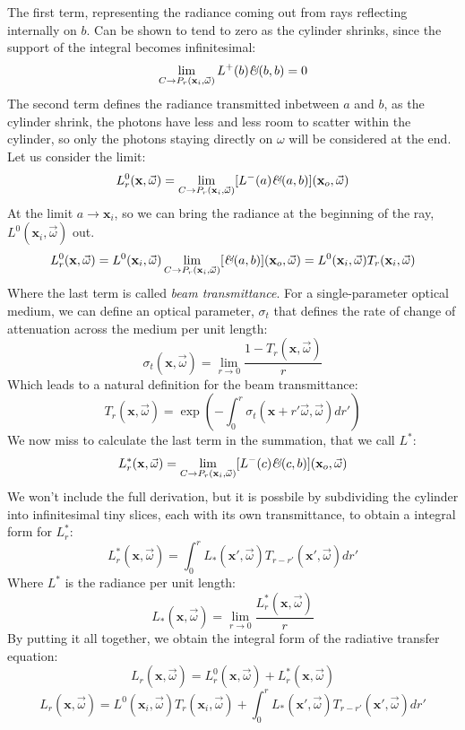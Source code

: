 The first term, representing the radiance coming out from rays reflecting internally on $b$. Can be shown to tend to zero as the cylinder shrinks, since the support of the integral becomes infinitesimal:
$$
\lim_{C\rightarrow P_r(\mathbf{x}_i,\vec{\omega})} L^+(b)\textit{\text{\&}}(b,b) = 0
$$
The second term defines the radiance transmitted inbetween $a$ and $b$, as the cylinder shrink, the photons have less and less room to scatter within the cylinder, so only the photons staying directly on $\omega$ will be considered at the end. Let us consider the limit:
$$
L_r^0(\mathbf{x}, \vec{\omega}) = \lim_{C\rightarrow P_r(\mathbf{x}_i,\vec{\omega})} [L^-(a)\textit{\text{\&}}(a,b)] (\mathbf{x}_o, \vec{\omega})
$$
At the limit $a \rightarrow \mathbf{x}_i$, so we can bring the radiance at the beginning of the ray, $L^0(\mathbf{x}_i, \vec{\omega})$ out. 
$$
L_r^0(\mathbf{x}, \vec{\omega}) = L^0(\mathbf{x}_i, \vec{\omega})\lim_{C\rightarrow P_r(\mathbf{x}_i,\vec{\omega})} [\textit{\text{\&}}(a,b)] (\mathbf{x}_o, \vec{\omega}) = L^0(\mathbf{x}_i, \vec{\omega}) T_r(\mathbf{x}_i, \vec{\omega})
$$
Where the last term is called \emph{beam transmittance}. For a single-parameter optical medium, we can define an optical parameter, $\sigma_t$ that defines the rate of change of attenuation across the medium per unit length:
$$
\sigma_t(\mathbf{x}, \vec{\omega}) = \lim_{r\rightarrow 0} \frac{1 - T_r(\mathbf{x}, \vec{\omega})}{r}
$$
Which leads to a natural definition for the beam transmittance:
$$
T_r(\mathbf{x}, \vec{\omega}) = \exp\left(-\int_0^r \sigma_t(\mathbf{x} + r' \vec{\omega}, \vec{\omega}) dr'\right)
$$
We now miss to calculate the last term in the summation, that we call $L^*$:
$$
L_r^*(\mathbf{x}, \vec{\omega}) = \lim_{C\rightarrow P_r(\mathbf{x}_i,\vec{\omega})} [L^-(c)\textit{\text{\&}}(c,b)] (\mathbf{x}_o, \vec{\omega})
$$
We won't include the full derivation, but it is possbile by subdividing the cylinder into infinitesimal tiny slices, each with its own transmittance, to obtain a integral form for $L_r^*$:
$$
L_r^*(\mathbf{x}, \vec{\omega}) = \int_0^r L_*(\mathbf{x}', \vec{\omega}) T_{r-r'}(\mathbf{x}', \vec{\omega})  dr'
$$
Where $L^*$ is the radiance per unit length:
$$
L_*(\mathbf{x}, \vec{\omega}) = \lim_{r \rightarrow 0} \frac{L_r^*(\mathbf{x}, \vec{\omega})}{r}
$$
By putting it all together, we obtain the integral form of the radiative transfer equation:
$$
L_r(\mathbf{x}, \vec{\omega}) = L_r^0(\mathbf{x}, \vec{\omega}) + L_r^*(\mathbf{x}, \vec{\omega})
$$
$$
L_r(\mathbf{x}, \vec{\omega}) =  L^0(\mathbf{x}_i, \vec{\omega}) T_r(\mathbf{x}_i, \vec{\omega}) + \int_0^r L_*(\mathbf{x}', \vec{\omega}) T_{r-r'}(\mathbf{x}', \vec{\omega})  dr'
$$
